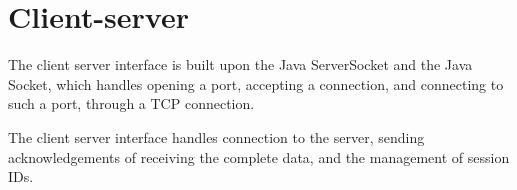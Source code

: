 \section{Client-server}
The client server interface is built upon the Java ServerSocket and the Java Socket,
which handles opening a port, accepting a connection, and connecting to such a port,
through a TCP connection.

The client server interface handles connection to the server,
sending acknowledgements of receiving the complete data,
and the management of session IDs. 

